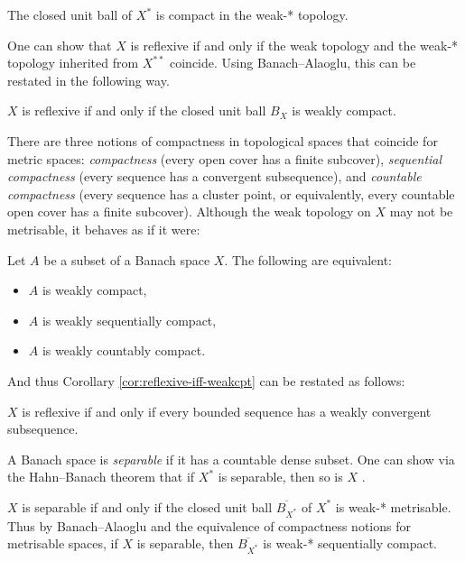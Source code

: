 \cite[Theorem IV.21]{RS80}
\begin{thm}
  The closed unit ball of $X^*$ is compact in the weak-* topology.
\end{thm}

One can show that $X$ is reflexive if and only if the weak topology and the weak-* topology inherited from $X^{**}$ coincide.
Using Banach--Alaoglu, this can be restated in the following way.

\begin{cor}\label{cor:reflexive-iff-weakcpt}
  $X$ is reflexive if and only if the closed unit ball $B_{X}$ is weakly compact.
\end{cor}


There are three notions of compactness in topological spaces that coincide for metric spaces: \emph{compactness} (every open cover has a finite subcover), \emph{sequential compactness} (every sequence has a convergent subsequence), and \emph{countable compactness} (every sequence has a cluster point, or equivalently, every countable open cover has a finite subcover).
Although the weak topology on $X$ may not be metrisable, it behaves as if it were:

\begin{thm}
  Let $A$ be a subset of a Banach space $X$.
  The following are equivalent:
  \begin{itemize}
  \item $A$ is weakly compact,
  \item $A$ is weakly sequentially compact,
  \item $A$ is weakly countably compact.
  \end{itemize}
\end{thm}

And thus Corollary \ref{cor:reflexive-iff-weakcpt} can be restated as follows:

\begin{cor}
  $X$ is reflexive if and only if every bounded sequence has a weakly convergent subsequence.
\end{cor}

A Banach space is \emph{separable} if it has a countable dense subset.
One can show via the Hahn--Banach theorem that if $X^*$ is separable, then so is $X$ \cite[Theorem III.7]{RS80}.

\begin{thm}\label{thm:sep-met-dual}
  $X$ is separable if and only if the closed unit ball $\overline{B_{X^*}}$ of $X^*$ is weak-* metrisable.
  Thus by Banach--Alaoglu and the equivalence of compactness notions for metrisable spaces, if $X$ is separable, then $\overline{B_{X^*}}$ is weak-* sequentially compact.
\end{thm}



